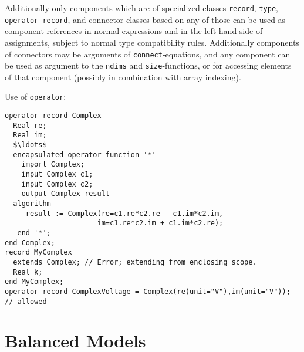 Additionally only components which are of specialized classes \lstinline!record!, \lstinline!type!, \lstinline!operator record!, and connector classes based on any of those can be used as component references in normal expressions and in the left hand side of assignments, subject to normal type compatibility rules.
Additionally components of connectors may be arguments of \lstinline!connect!-equations, and any component can be used as argument to the \lstinline!ndims! and \lstinline!size!-functions, or for accessing elements of that component (possibly in combination with array indexing).

\begin{example}
Use of \lstinline!operator!:
\begin{lstlisting}[language=modelica]
operator record Complex
  Real re;
  Real im;
  $\ldots$
  encapsulated operator function '*'
    import Complex;
    input Complex c1;
    input Complex c2;
    output Complex result
  algorithm
     result := Complex(re=c1.re*c2.re - c1.im*c2.im,
                      im=c1.re*c2.im + c1.im*c2.re);
   end '*';
end Complex;
record MyComplex
  extends Complex; // Error; extending from enclosing scope.
  Real k;
end MyComplex;
operator record ComplexVoltage = Complex(re(unit="V"),im(unit="V")); // allowed
\end{lstlisting}
\end{example}

\section{Balanced Models}\label{balanced-models}

